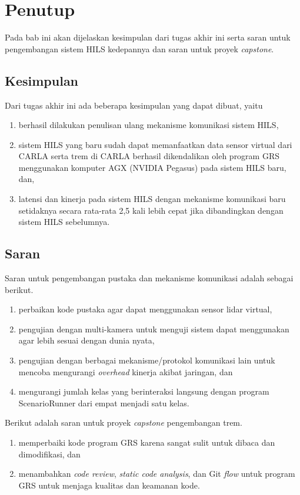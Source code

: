 \chapter{Penutup}\label{chapter-5}

Pada bab ini akan dijelaskan kesimpulan dari tugas akhir ini serta saran untuk
pengembangan sistem HILS kedepannya dan saran untuk proyek \textit{capstone}.

\section{Kesimpulan}

Dari tugas akhir ini ada beberapa kesimpulan yang dapat dibuat, yaitu
\begin{enumerate}
	\item berhasil dilakukan penulisan ulang mekanisme komunikasi sistem HILS,
	\item sistem HILS yang baru sudah dapat memanfaatkan data sensor virtual
	      dari CARLA serta trem di CARLA berhasil dikendalikan oleh program GRS
	      menggunakan komputer AGX (NVIDIA Pegasus) pada sistem HILS baru, dan,
	\item latensi dan kinerja pada sistem HILS dengan mekanisme komunikasi baru
	      setidaknya secara rata-rata 2,5 kali lebih cepat jika dibandingkan
	      dengan sistem HILS sebelumnya.
\end{enumerate}

\section{Saran}

Saran untuk pengembangan pustaka dan mekanisme komunikasi adalah sebagai
berikut.
\begin{enumerate}
	\item perbaikan kode pustaka agar dapat menggunakan sensor lidar virtual,
	\item pengujian dengan multi-kamera untuk menguji sistem dapat menggunakan
	      agar lebih sesuai dengan dunia nyata,
	\item pengujian dengan berbagai mekanisme/protokol komunikasi lain untuk
	      mencoba mengurangi \textit{overhead} kinerja akibat jaringan, dan
	\item mengurangi jumlah kelas yang berinteraksi langsung dengan program
	      ScenarioRunner dari empat menjadi satu kelas.
\end{enumerate}

Berikut adalah saran untuk proyek \textit{capstone} pengembangan trem.
\begin{enumerate}
	\item memperbaiki kode program GRS karena sangat sulit untuk dibaca dan
	      dimodifikasi, dan
	\item menambahkan \textit{code review}, \textit{static code analysis}, dan
	      Git \textit{flow} untuk program GRS untuk menjaga kualitas dan keamanan
	      kode.
\end{enumerate}
